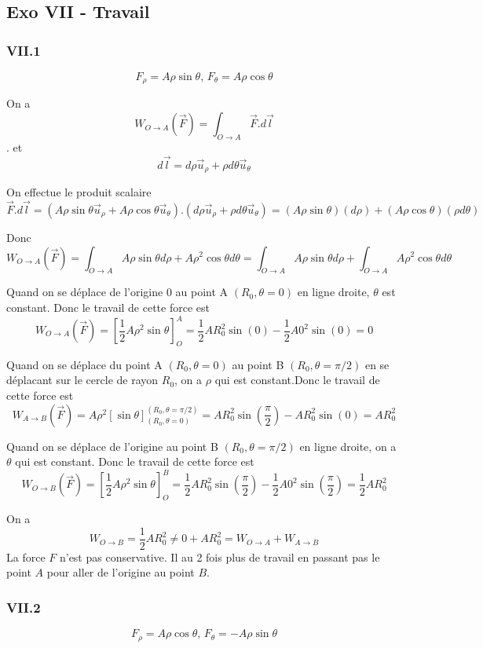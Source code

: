 \documentclass[]{book}
\theoremstyle{definition}
\begin{document}
\subsection*{Exo VII - Travail}
\subsubsection*{VII.1}
$$F_{\rho} = A \rho \sin \theta,\, F_{\theta} = A \rho \cos \theta$$

On a 
$$W_{O \to A}(\vec{F}) = \int_{O \to A} \vec{F}.d\vec{l}$$.
et
$$d\vec{l} = d\rho\vec{u}_{\rho} + \rho d\theta\vec{u}_{\theta}$$

On effectue le produit scalaire
$$\vec{F}.d\vec{l} = (A \rho \sin \theta\vec{u}_{\rho} + A \rho \cos \theta\vec{u}_{\theta}).(d\rho\vec{u}_{\rho} + \rho d\theta\vec{u}_{\theta}) = (A \rho \sin \theta) (d\rho) + (A \rho \cos \theta)(\rho d\theta)$$

Donc 
$$W_{O \to A}(\vec{F}) = \int_{O \to A} {A \rho \sin \theta d\rho + A \rho^2 \cos \theta d\theta} = \int_{O \to A} {A \rho \sin \theta d\rho} + \int_{O \to A} {A \rho^2 \cos \theta d\theta}$$

Quand on se d\'eplace de l'origine 0 au point A $(R_0,\theta = 0)$ en ligne droite, $\theta$ est constant. Donc le travail de cette force est
$$W_{O \to A}(\vec{F})=\left[ \frac{1}{2}A\rho^2 \sin \theta \right]_{O}^{A} = \frac{1}{2}AR_0^2\sin(0) - \frac{1}{2}A0^2\sin(0) = 0$$

Quand on se d\'eplace du point A $(R_0,\theta = 0)$ au point B $(R_0, \theta=\pi/2)$ en se d\'eplacant sur le cercle de rayon $R_0$, on a $\rho$ qui est constant.Donc le travail de cette force est
$$W_{A \to B}(\vec{F})= A\rho^2\left[\sin \theta \right]_{(R_0,\theta=0)}^{(R_0,\theta=\pi/2)} = AR_0^2\sin(\frac{\pi}{2}) - AR_0^2\sin(0) = AR_0^2$$

Quand on se d\'eplace de l'origine au point B $(R_0, \theta=\pi/2)$ en ligne droite, on a $\theta$ qui est constant. Donc le travail de cette force est
$$W_{O \to B}(\vec{F})=\left[ \frac{1}{2}A\rho^2 \sin \theta \right]_{O}^{B} = \frac{1}{2}AR_0^2\sin(\frac{\pi}{2}) - \frac{1}{2}A0^2\sin(\frac{\pi}{2}) = \frac{1}{2}AR_0^2$$

On a 
$$W_{O \to B} = \frac{1}{2}AR_0^2 \neq 0 + AR_0^2 = W_{O \to A} + W_{A \to B}$$
La force $F$ n'est pas conservative. Il au 2 fois plus de travail en passant pas le point $A$ pour aller de l'origine au point $B$.


\subsubsection*{VII.2}
$$F_{\rho} = A \rho \cos \theta,\, F_{\theta} = -A \rho \sin \theta$$
\end{document}
